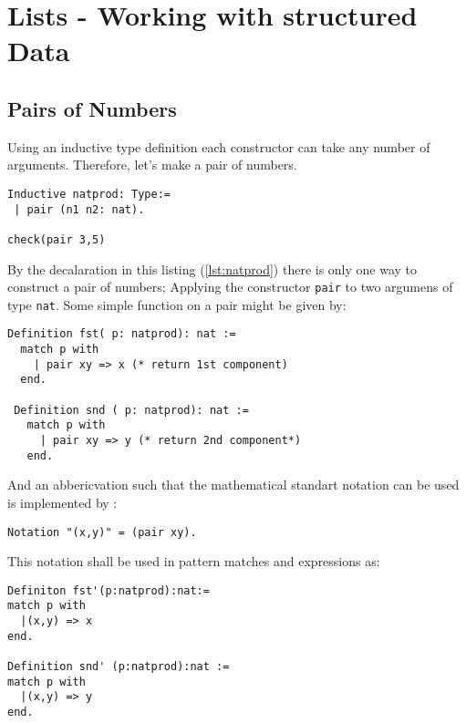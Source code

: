 \section{Lists - Working with structured Data}

\subsection{Pairs of Numbers}

Using an inductive type definition each constructor can take any number of arguments. 
Therefore, let's make a pair of numbers.

\begin{lstlisting}[caption = \lstinline!natprod!, label = lst:natprod]
Inductive natprod: Type:=
 | pair (n1 n2: nat).

check(pair 3,5)
\end{lstlisting}
By the decalaration in this listing (\ref{lst:natprod}) there is only one way to construct a pair of numbers; 
Applying the constructor \lstinline!pair! to two argumens of type \lstinline!nat!.
Some simple function on a pair might be given by: 
\begin{lstlisting}[caption = \lstinline!fst!, label = lst:fst]
Definition fst( p: natprod): nat :=
  match p with 
    | pair xy => x (* return 1st component)
  end.
 
 Definition snd ( p: natprod): nat :=
   match p with 
     | pair xy => y (* return 2nd component*)
   end.
\end{lstlisting}

And an abbericvation such that the mathematical standart notation can be used is implemented by :
\begin{lstlisting}[caption=\lstinline!pair!-naotation, label = lst:pairNotation]
Notation "(x,y)" = (pair xy).
\end{lstlisting}

This notation shall be used in pattern matches and expressions as: 
\begin{lstlisting}[caption = \lstinline!fst'! and \lstinline!snd'!, label =lst:newNotation ]
Definiton fst'(p:natprod):nat:=
match p with
  |(x,y) => x
end.

Definition snd' (p:natprod):nat :=
match p with
  |(x,y) => y
end.
\end{lstlisting}




